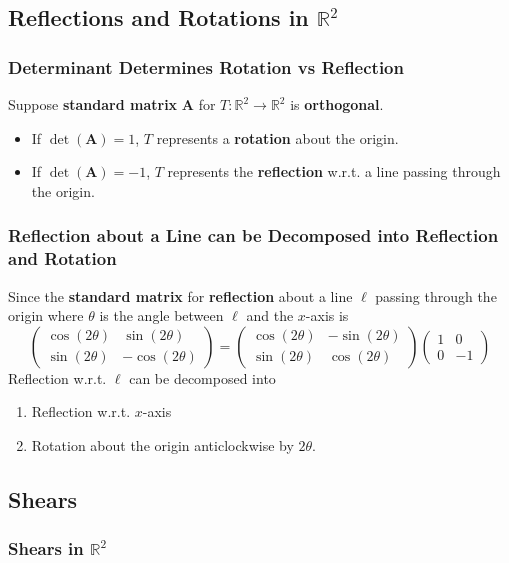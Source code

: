 \documentclass[../ma2001_notes.tex]{subfiles}
\begin{document}
\subsection{Reflections and Rotations in $\mathbb{R}^2$}
\subsubsection{Determinant Determines Rotation vs Reflection}
Suppose \textbf{standard matrix} \(\bm{A}\) for \(T:\mathbb{R}^2\to\mathbb{R}^2\) is \textbf{orthogonal}.
\begin{itemize}
	\item If \(\det(\bm{A})=1\), \(T\) represents a \textbf{rotation} about the origin.
	\item If \(\det(\bm{A})=-1\), \(T\) represents the \textbf{reflection} w.r.t. a line passing through the origin.
\end{itemize}

\subsubsection{Reflection about a Line can be Decomposed into Reflection and Rotation}
Since the \textbf{standard matrix} for \textbf{reflection} about a line \(\ell\) passing through the origin where \(\theta\) is the angle between \(\ell\) and the \(x\)-axis is
\[\begin{pmatrix}
	\cos(2\theta) & \sin(2\theta) \\ \sin(2\theta) & -\cos(2\theta)
\end{pmatrix}=\begin{pmatrix}
	\cos(2\theta) & -\sin(2\theta) \\ \sin(2\theta) & \cos(2\theta)
\end{pmatrix}\begin{pmatrix}
	1 & 0 \\ 0 & -1
\end{pmatrix}\]
Reflection w.r.t. \(\ell\) can be decomposed into
\begin{enumerate}
	\item Reflection w.r.t. \(x\)-axis
	\item Rotation about the origin anticlockwise by \(2\theta\).
\end{enumerate}

\subsection{Shears}
\subsubsection{Shears in $\mathbb{R}^2$}
\end{document}
